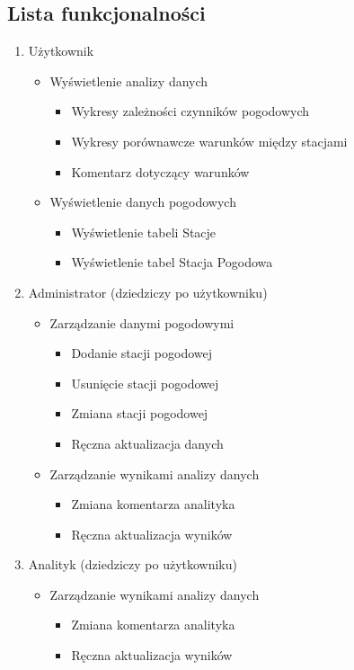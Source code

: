 \documentclass[12pt,a4paper]{article}
\begin{document}
\subsection{Lista funkcjonalności}
\begin{enumerate}
\item Użytkownik
	\begin{itemize}
	\item Wyświetlenie analizy danych
		\begin{itemize}
		\item Wykresy zależności czynników pogodowych
		\item Wykresy porównawcze warunków między stacjami
		\item Komentarz dotyczący warunków
		\end{itemize}
	\item Wyświetlenie danych pogodowych
		\begin{itemize}
		\item Wyświetlenie tabeli Stacje
		\item Wyświetlenie tabel Stacja Pogodowa
		\end{itemize}
	\end{itemize}
\item Administrator (dziedziczy po użytkowniku)
	\begin{itemize}
	\item Zarządzanie danymi pogodowymi
		\begin{itemize}
		\item Dodanie stacji pogodowej
		\item Usunięcie stacji pogodowej
		\item Zmiana stacji pogodowej
		\item Ręczna aktualizacja danych
		\end{itemize}
	\item Zarządzanie wynikami analizy danych
		\begin{itemize}
		\item Zmiana komentarza analityka
		\item Ręczna aktualizacja wyników
		\end{itemize}
	\end{itemize}
\item Analityk (dziedziczy po użytkowniku)
	\begin{itemize}
	\item Zarządzanie wynikami analizy danych
		\begin{itemize}
		\item Zmiana komentarza analityka
		\item Ręczna aktualizacja wyników
		\end{itemize}
	\end{itemize}
\end{enumerate}
\end{document}
